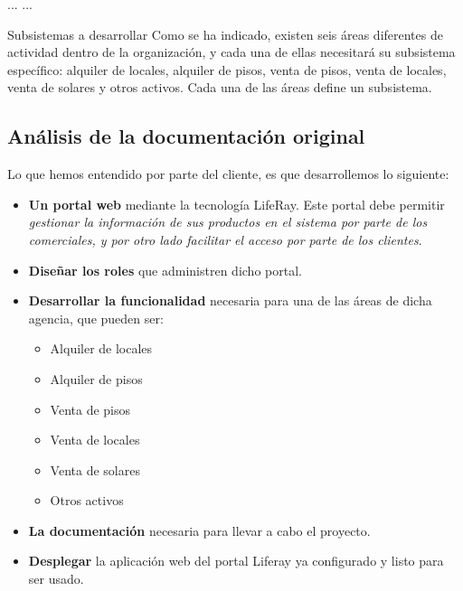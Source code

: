 \begin{minipage}{40em}
...
...

Subsistemas a desarrollar
Como se ha indicado, existen seis áreas diferentes de actividad dentro de la
organización, y cada una de ellas necesitará su subsistema específico: alquiler de
locales, alquiler de pisos, venta de pisos, venta de locales, venta de solares y otros
activos. Cada una de las áreas define un subsistema.

\end{minipage}
\subsection{Análisis de la documentación original}
\par Lo que hemos entendido por parte del cliente, es que desarrollemos lo siguiente:
\begin{itemize}
	\item \textbf{Un portal web} mediante la tecnología LifeRay. Este portal debe permitir \textit{gestionar la información de sus productos en el sistema por parte de los
comerciales, y por otro lado facilitar el acceso por parte de los clientes}.
	\item \textbf{Diseñar los roles} que administren dicho portal.
	\item \textbf{Desarrollar la funcionalidad} necesaria para una de las áreas de dicha agencia, que pueden ser:
	\begin{itemize}
	 	\item Alquiler de locales
	 	\item Alquiler de pisos
	 	\item Venta de pisos
	 	\item Venta de locales
	 	\item Venta de solares
	 	\item Otros activos
	 \end{itemize}
	 \item \textbf{La documentación} necesaria para llevar a cabo el proyecto.
	 \item \textbf{Desplegar} la aplicación web del portal Liferay ya configurado y listo para ser usado.
\end{itemize}